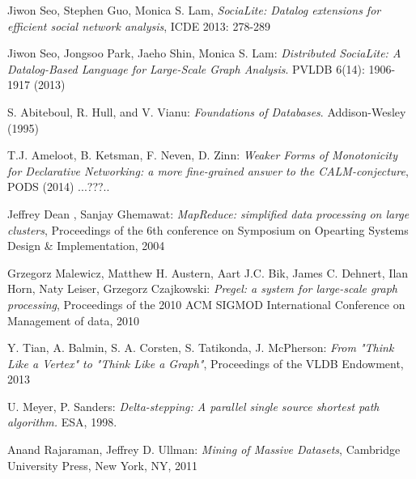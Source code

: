 \documentclass{pracamgr}
\theoremstyle{plain}
\theoremstyle{definition}
\theoremstyle{remark}
\begin{document}
\begin{thebibliography}{99}


 Jiwon Seo, Stephen Guo, Monica S. Lam, \textit{SociaLite: Datalog extensions for efficient social network analysis}, ICDE 2013: 278-289

 Jiwon Seo, Jongsoo Park, Jaeho Shin, Monica S. Lam: \textit{Distributed SociaLite: A Datalog-Based Language for Large-Scale Graph Analysis}. PVLDB 6(14): 1906-1917 (2013)

 S. Abiteboul, R. Hull, and V. Vianu: \textit{Foundations of Databases}. Addison-Wesley (1995)

 T.J. Ameloot, B. Ketsman, F. Neven, D. Zinn: \textit{Weaker Forms of Monotonicity for Declarative Networking: a more fine-grained answer to the CALM-conjecture}, PODS (2014) ...???..

 Jeffrey Dean , Sanjay Ghemawat: \textit{MapReduce: simplified data processing on large clusters}, Proceedings of the 6th conference on Symposium on Opearting Systems Design \& Implementation, 2004

 Grzegorz Malewicz, Matthew H. Austern, Aart J.C. Bik, James C. Dehnert, Ilan Horn, Naty Leiser, Grzegorz Czajkowski: \textit{Pregel: a system for large-scale graph processing}, Proceedings of the 2010 ACM SIGMOD International Conference on Management of data, 2010

 Y. Tian, A. Balmin, S. A. Corsten, S. Tatikonda, J. McPherson: \textit{From "Think Like a Vertex" to "Think Like a Graph"}, Proceedings of the VLDB Endowment, 2013

 U. Meyer, P. Sanders: \textit{Delta-stepping: A parallel
single source shortest path algorithm.} ESA, 1998.

 Anand Rajaraman, Jeffrey D. Ullman: \textit{Mining of Massive Datasets}, Cambridge University Press, New York, NY, 2011

\begin{comment}
\bibitem[Fif00]{ffgg} Filigran Fifak, Gizbert Gryzogrzechotalski,
  \textit{O blabalii fetorycznej}, Materiały Konferencji Euroblabal
  2000.

\bibitem[Fif01]{ff-sr} Filigran Fifak, \textit{O fetorach
    $\sigma$-$\rho$}, Acta Fetorica, 2001.

\bibitem[Głomb04]{grglo} Gryzybór Głombaski, \textit{Parazytonikacja
    blabiczna fetorów --- nowa teoria wszystkiego}, Warszawa 1904.


\end{comment}
\end{thebibliography}
\end{document}
